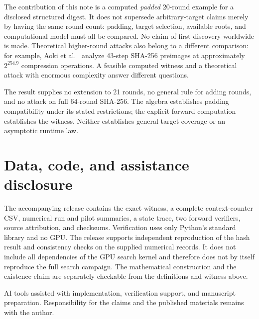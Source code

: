 \documentclass[11pt,a4paper]{article}
\begin{document}
The contribution of this note is a computed \emph{padded} 20-round example for a disclosed structured digest. It does not supersede arbitrary-target claims merely by having the same round count: padding, target selection, available roots, and computational model must all be compared. No claim of first discovery worldwide is made. Theoretical higher-round attacks also belong to a different comparison: for example, Aoki et al.~\cite{aoki} analyze 43-step SHA-256 preimages at approximately $2^{254.9}$ compression operations. A feasible computed witness and a theoretical attack with enormous complexity answer different questions.

The result supplies no extension to 21 rounds, no general rule for adding rounds, and no attack on full 64-round SHA-256. The algebra establishes padding compatibility under its stated restrictions; the explicit forward computation establishes the witness. Neither establishes general target coverage or an asymptotic runtime law.

\section*{Data, code, and assistance disclosure}
The accompanying release contains the exact witness, a complete context-counter CSV, numerical run and pilot summaries, a state trace, two forward verifiers, source attribution, and checksums. Verification uses only Python's standard library and no GPU. The release supports independent reproduction of the hash result and consistency checks on the supplied numerical records. It does not include all dependencies of the GPU search kernel and therefore does not by itself reproduce the full search campaign. The mathematical construction and the existence claim are separately checkable from the definitions and witness above.

AI tools assisted with implementation, verification support, and manuscript preparation. Responsibility for the claims and the published materials remains with the author.

\appendix
\end{document}

